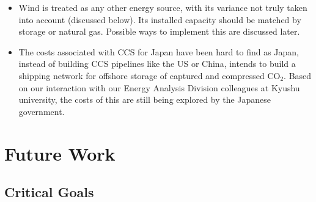 \documentclass[14pt,a4paper]{article} %
\begin{document}
\begin{enumerate}
\begin{itemize}
\item Wind is treated as any other energy source, with its variance not truly taken into account (discussed below). Its installed capacity should be matched by storage or natural gas. Possible ways to implement this are discussed later.

\item The costs associated with CCS for Japan have been hard to find as Japan, instead of building CCS pipelines like the US or China, intends to build a shipping network for offshore storage of captured and compressed CO$_2$. Based on our interaction with our Energy Analysis Division colleagues at Kyushu university, the costs of this are still being explored by the Japanese government.

\end{itemize}

\end{enumerate}

\section{Future Work} 

\subsection{Critical Goals}
\end{document}

